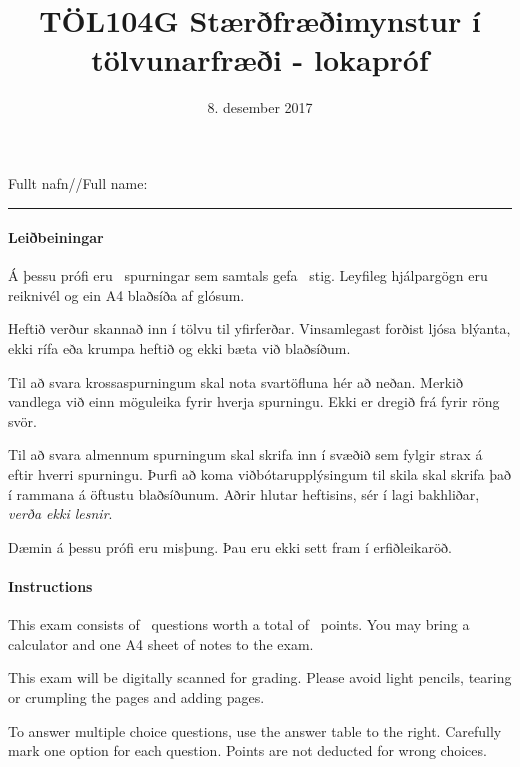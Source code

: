 \documentclass[addpoints]{exam}
\author{}
\date{}
\title{TÖL104G Stærðfræðimynstur í tölvunarfræði - lokapróf}
\author{}
\date{8. desember 2017}
\begin{document}
Fullt nafn//Full name: \vspace*{1mm} \hrule

\begin{center}
    \begin{minipage}{\textwidth}
    
    \vspace{0.7cm}
    \paragraph{Leiðbeiningar} Á þessu prófi eru \numquestions\ spurningar sem samtals gefa \numpoints\ stig. Leyfileg hjálpargögn eru reiknivél og ein A4 blaðsíða af glósum.
    
    Heftið verður skannað inn í tölvu til yfirferðar. Vinsamlegast forðist ljósa blýanta, ekki rífa eða krumpa heftið og ekki bæta við blaðsíðum. 
    
    Til að svara krossaspurningum skal nota svartöfluna hér að neðan. Merkið vandlega við einn möguleika fyrir hverja spurningu. Ekki er dregið frá fyrir röng svör. 
    
    Til að svara almennum spurningum skal skrifa inn í svæðið sem fylgir strax á eftir hverri spurningu. Þurfi að koma viðbótarupplýsingum til skila skal skrifa það í rammana á öftustu blaðsíðunum. Aðrir hlutar heftisins, sér í lagi bakhliðar, \emph{verða ekki lesnir}.
    
    Dæmin á þessu prófi eru misþung. Þau eru ekki sett fram í erfiðleikaröð.
    
    \vspace{0.7cm}
    

    \begin{multicols}{2}

        \paragraph{Instructions} This exam consists of \numquestions\ questions worth a total of \numpoints\ points. You may bring a calculator and one A4 sheet of notes to the exam.
        
        This exam will be digitally scanned for grading. Please avoid light pencils, tearing or crumpling the pages and adding pages. 
        
        To answer multiple choice questions, use the answer table to the right. Carefully mark one option for each question. Points are not deducted for wrong choices. 
        

\end{multicols}
\end{minipage}
\end{center}
\end{document}
